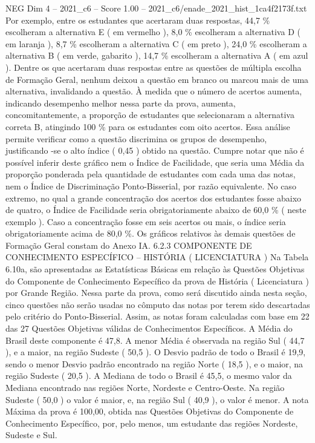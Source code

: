 \begin{textsample}{NEG Dim 4 – 2021\_c6 – Score 1.00 – 2021\_c6/enade\_2021\_hist\_1ca4f2173f.txt}
Por exemplo, entre os estudantes que acertaram duas respostas, 44,7 \% escolheram a alternativa E ( em vermelho ), 8,0 \% escolheram a alternativa D ( em laranja ), 8,7 \% escolheram a alternativa C ( em preto ), 24,0 \% escolheram a alternativa B ( em verde, gabarito ), 14,7 \% escolheram a alternativa A ( em azul ).
Dentre os que acertaram duas respostas entre as questões de múltipla escolha de Formação Geral, nenhum deixou a questão em branco ou marcou mais de uma alternativa, invalidando a questão.
À medida que o número de acertos aumenta, indicando desempenho melhor nessa parte da prova, aumenta, concomitantemente, a proporção de estudantes que selecionaram a alternativa correta B, atingindo 100 \% para os estudantes com oito acertos.
Essa análise permite verificar como a questão discrimina os grupos de desempenho, justificando -se o alto índice ( 0,45 ) obtido na questão.
Cumpre notar que não é possível inferir deste gráfico nem o Índice de Facilidade, que seria uma Média da proporção ponderada pela quantidade de estudantes com cada uma das notas, nem o Índice de Discriminação Ponto-Bisserial, por razão equivalente.
No caso extremo, no qual a grande concentração dos acertos dos estudantes fosse abaixo de quatro, o Índice de Facilidade seria obrigatoriamente abaixo de 60,0 \% ( neste exemplo ).
Caso a concentração fosse em seis acertos ou mais, o índice seria obrigatoriamente acima de 80,0 \%.
Os gráficos relativos às demais questões de Formação Geral constam do Anexo IA. 6.2.3 COMPONENTE DE CONHECIMENTO ESPECÍFICO – HISTÓRIA ( LICENCIATURA ) Na Tabela 6.10a, são apresentadas as Estatísticas Básicas em relação às Questões Objetivas do Componente de Conhecimento Específico da prova de História ( Licenciatura ) por Grande Região.
Nessa parte da prova, como será discutido ainda nesta seção, cinco questões não serão usadas no cômputo das notas por terem sido descartadas pelo critério do Ponto-Bisserial.
Assim, as notas foram calculadas com base em 22 das 27 Questões Objetivas válidas de Conhecimentos Específicos.
A Média do Brasil deste componente é 47,8.
A menor Média é observada na região Sul ( 44,7 ), e a maior, na região Sudeste ( 50,5 ).
O Desvio padrão de todo o Brasil é 19,9, sendo o menor Desvio padrão encontrado na região Norte ( 18,5 ), e o maior, na região Sudeste ( 20,5 ).
A Mediana de todo o Brasil é 45,5, o mesmo valor da Mediana encontrado nas regiões Norte, Nordeste e Centro-Oeste.
Na região Sudeste ( 50,0 ) o valor é maior, e, na região Sul ( 40,9 ), o valor é menor.
A nota Máxima da prova é 100,00, obtida nas Questões Objetivas do Componente de Conhecimento Específico, por, pelo menos, um estudante das regiões Nordeste, Sudeste e Sul.

\end{textsample}
